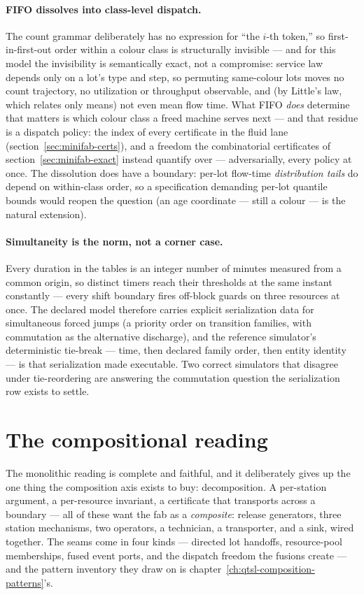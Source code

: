 \paragraph{FIFO dissolves into class-level dispatch.} The count
grammar deliberately has no expression for ``the $i$-th token,'' so
first-in-first-out order within a colour class is structurally
invisible --- and for this model the invisibility is semantically
exact, not a compromise: service law depends only on a lot's type and
step, so permuting same-colour lots moves no count trajectory, no
utilization or throughput observable, and (by Little's law, which
relates only means) not even mean flow time. What FIFO \emph{does}
determine that matters is which colour class a freed machine serves
next --- and that residue is a dispatch policy: the index of every
certificate in the fluid lane (section~\ref{sec:minifab-certs}), and
a freedom the combinatorial certificates of
section~\ref{sec:minifab-exact} instead quantify over ---
adversarially, every policy at once. The
dissolution does have a boundary: per-lot flow-time
\emph{distribution tails} do depend on within-class order, so a
specification demanding per-lot quantile bounds would reopen the
question (an age coordinate --- still a colour --- is the natural
extension).

\paragraph{Simultaneity is the norm, not a corner case.} Every
duration in the tables is an integer number of minutes measured from
a common origin, so distinct timers reach their thresholds at the
same instant constantly --- every shift boundary fires off-block
guards on three resources at once. The declared model therefore
carries explicit serialization data for simultaneous forced jumps
(a priority order on transition families, with commutation as the
alternative discharge), and the reference simulator's deterministic
tie-break --- time, then declared family order, then entity identity
--- is that serialization made executable. Two correct simulators
that disagree under tie-reordering are answering the commutation
question the serialization row exists to settle.

\section{The compositional reading}
\label{sec:minifab-composite}

The monolithic reading is complete and faithful, and it deliberately
gives up the one thing the composition axis exists to buy:
decomposition. A per-station argument, a per-resource invariant, a
certificate that transports across a boundary --- all of these want
the fab as a \emph{composite}: release generators, three station
mechanisms, two operators, a technician, a transporter, and a sink,
wired together. The seams come in four kinds --- directed lot
handoffs, resource-pool memberships, fused event ports, and the
dispatch freedom the fusions create --- and the pattern inventory
they draw on is chapter~\ref{ch:qtsl-composition-patterns}'s.

